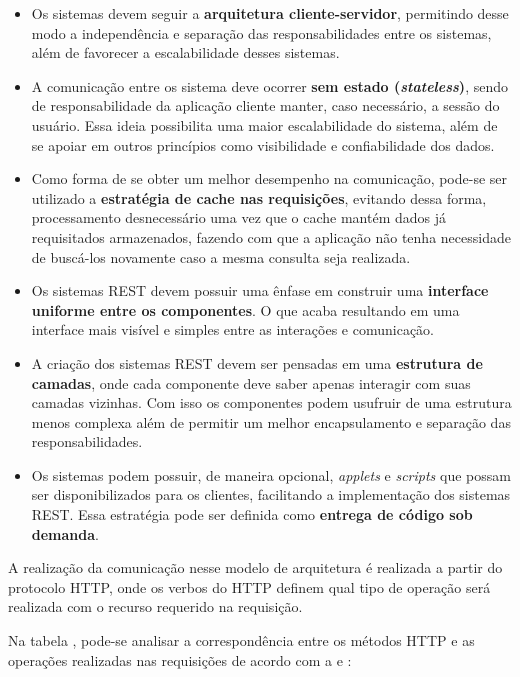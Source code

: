 \begin{itemize}
		\item Os sistemas devem seguir a \textbf{arquitetura cliente-servidor}, permitindo desse modo a independência e separação das responsabilidades entre os sistemas, além de favorecer a escalabilidade desses sistemas.
		
		\item A comunicação entre os sistema deve ocorrer \textbf{sem estado (\textit{stateless})}, sendo de responsabilidade da aplicação cliente manter, caso necessário, a sessão do usuário. Essa ideia possibilita uma maior escalabilidade do sistema, além de se apoiar em outros princípios como visibilidade e confiabilidade dos dados.
		
		\item Como forma de se obter um melhor desempenho na comunicação, pode-se ser utilizado a \textbf{estratégia de cache nas requisições}, evitando dessa forma, processamento desnecessário uma vez que o cache mantém dados já requisitados armazenados, fazendo com que a aplicação não tenha necessidade de buscá-los novamente caso a mesma consulta seja realizada.
		
		\item Os sistemas REST devem possuir uma ênfase em construir uma \textbf{interface uniforme entre os componentes}. O que acaba resultando em uma interface mais visível e simples entre as interações e comunicação.
		
		\item A criação dos sistemas REST devem ser pensadas em uma \textbf{estrutura de camadas}, onde cada componente deve saber apenas interagir com suas camadas vizinhas. Com isso os componentes podem usufruir de uma estrutura menos complexa além de permitir um melhor encapsulamento e separação das responsabilidades.
		
		\item Os sistemas podem possuir, de maneira opcional, \textit{applets} e \textit{scripts} que possam ser disponibilizados para os clientes, facilitando a implementação dos sistemas REST. Essa estratégia pode ser definida como \textbf{entrega de código sob demanda}.
	\end{itemize}

A realização da comunicação nesse modelo de arquitetura é realizada a partir do protocolo HTTP, onde os verbos do HTTP definem qual tipo de operação será realizada com o recurso requerido na requisição.

Na tabela , pode-se analisar a correspondência entre os métodos HTTP e as operações realizadas nas requisições de acordo com a  e :

